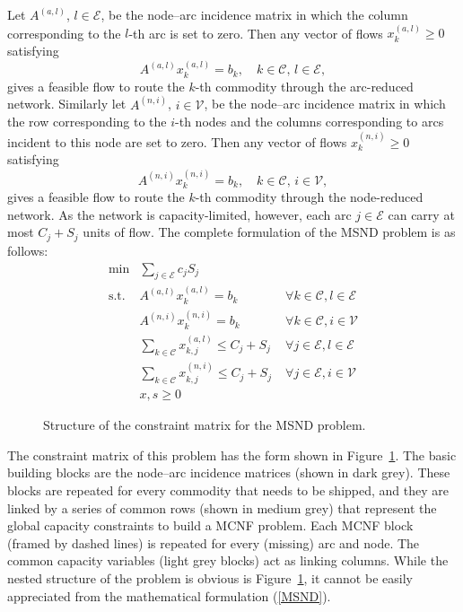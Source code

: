 \documentclass[10pt,a4paper]{book}
\begin{document}
Let $A^{(a,l)}$, $l\in\mathcal{E}$, be the node--arc incidence matrix in
which the column corresponding to the $l$-th arc is set to zero. Then any
vector of flows $x_k^{(a,l)}\ge 0$ satisfying
\[
A^{(a,l)} x_k^{(a,l)} = b_k,\quad k \in\mathcal{C},\, l\in\mathcal{E},
\]
gives a feasible flow to route the $k$-th commodity through the
arc-reduced network. Similarly let $A^{(n,i)}$, $i\in\mathcal{V}$, be the node--arc incidence matrix in
which the row corresponding to the $i$-th nodes and the columns
corresponding to arcs incident to this node are set to zero. Then any
vector of flows $x_k^{(n,i)}\ge 0$ satisfying
\[
A^{(n,i)} x_k^{(n,i)} = b_k,\quad k \in\mathcal{C},\, i\in\mathcal{V},
\]
gives a feasible flow to route the $k$-th commodity through the
node-reduced network. 
As the network is capacity-limited, however,
each arc $j\in\mathcal{E}$ can carry at most
$C_j + S_j$ units of flow. 
The complete formulation of the MSND problem is as follows:
\begin{equation}
\begin{array}{rll}
\min & \displaystyle \sum_{j \in \mathcal{E}} c_j S_j\\
\text{s.t.} & A^{(a,l)} x_k^{(a,l)} = b_k
                  & \;\forall k\in\mathcal{C},l\in\mathcal{E}\\
            & A^{(n,i)} x_k^{(n,i)} = b_k
                  & \;\forall k\in\mathcal{C},i\in\mathcal{V}\\
            & \displaystyle \sum_{k\in\mathcal{C}} x_{k,j}^{(a,l)} \le C_j + S_j 
                   & \;\forall j\in\mathcal{E}, l\in \mathcal{E}\\
            & \displaystyle \sum_{k\in\mathcal{C}} x_{k,j}^{(n,i)} \le C_j + S_j 
                   & \;\forall j\in\mathcal{E}, i\in \mathcal{V}\\
            & x, s \ge 0
\end{array}\label{MSND}
\end{equation}

\begin{figure}[ht]
\begin{center}
\end{center}
\caption{Structure of the constraint matrix for the MSND problem.}
\label{MSND_struct}

\end{figure}
%

The constraint matrix of this problem has the form shown in Figure~\ref{MSND_struct}.
The basic building blocks are the node--arc incidence matrices (shown in dark grey).
These blocks are repeated for every commodity that
needs to be shipped, and they are linked by a series of common rows
(shown in medium grey)
that represent the global capacity constraints to build a MCNF
problem. Each MCNF block (framed by dashed lines) is repeated for every (missing) arc
and node. The common capacity variables (light grey blocks) act as linking
columns. 
While the nested structure of the problem is obvious is
Figure~\ref{MSND_struct}, it cannot be easily appreciated from the mathematical
formulation (\ref{MSND}).
\end{document}
